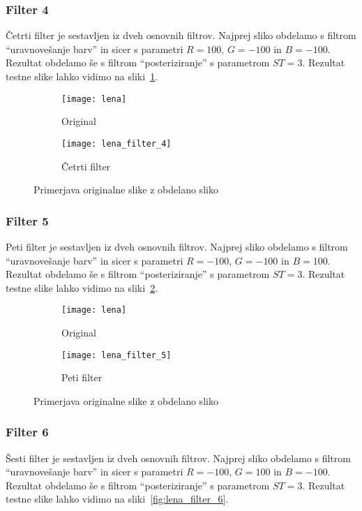 \subsubsection*{Filter 4}
Četrti filter je sestavljen iz dveh osnovnih filtrov. Najprej sliko obdelamo s
filtrom ``uravnovešanje barv'' in sicer s parametri $R = 100$, $G = -100$ in
$B = -100$. Rezultat obdelamo še s filtrom ``posteriziranje'' s parametrom
$ST = 3$. Rezultat testne slike lahko vidimo na sliki~\ref{fig:lena_filter_4}.

\begin{figure}[h]
    \centering
    \begin{subfigure}[b]{0.4\textwidth}
        \texttt{[image: lena]}
        \caption{Original}
    \end{subfigure}
    \begin{subfigure}[b]{0.4\textwidth}
        \texttt{[image: lena\_filter\_4]}
        \caption{Četrti filter}
    \end{subfigure}
    \caption{Primerjava originalne slike z obdelano sliko}
    \label{fig:lena_filter_4}
\end{figure}


\subsubsection*{Filter 5}
Peti filter je sestavljen iz dveh osnovnih filtrov. Najprej sliko obdelamo s
filtrom ``uravnovešanje barv'' in sicer s parametri $R = -100$, $G = -100$ in
$B = 100$. Rezultat obdelamo še s filtrom ``posteriziranje'' s parametrom
$ST = 3$. Rezultat testne slike lahko vidimo na sliki~\ref{fig:lena_filter_5}.

\begin{figure}[h]
    \centering
    \begin{subfigure}[b]{0.4\textwidth}
        \texttt{[image: lena]}
        \caption{Original}
    \end{subfigure}
    \begin{subfigure}[b]{0.4\textwidth}
        \texttt{[image: lena\_filter\_5]}
        \caption{Peti filter}
    \end{subfigure}
    \caption{Primerjava originalne slike z obdelano sliko}
    \label{fig:lena_filter_5}
\end{figure}


\subsubsection*{Filter 6}
Šesti filter je sestavljen iz dveh osnovnih filtrov. Najprej sliko obdelamo s
filtrom ``uravnovešanje barv'' in sicer s parametri $R = -100$, $G = 100$ in
$B = -100$. Rezultat obdelamo še s filtrom ``posteriziranje'' s parametrom
$ST = 3$. Rezultat testne slike lahko vidimo na sliki~\ref{fig:lena_filter_6}.

